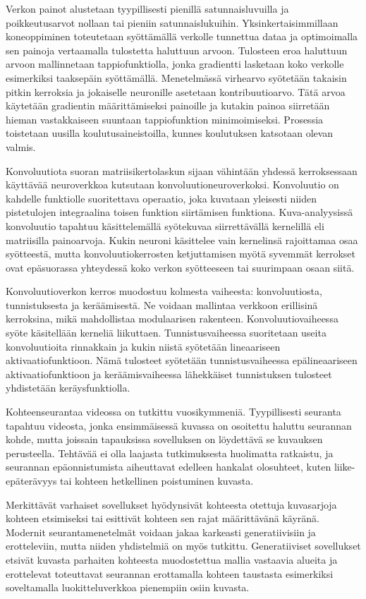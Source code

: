 Verkon painot alustetaan tyypillisesti pienillä satunnaisluvuilla ja poikkeutusarvot nollaan
tai pieniin satunnaislukuihin. Yksinkertaisimmillaan koneoppiminen toteutetaan syöttämällä
verkolle tunnettua dataa ja optimoimalla sen painoja vertaamalla tulostetta haluttuun arvoon.
Tulosteen eroa haluttuun arvoon mallinnetaan tappiofunktiolla, jonka gradientti lasketaan
koko verkolle esimerkiksi taaksepäin syöttämällä. Menetelmässä virhearvo syötetään takaisin
pitkin kerroksia ja jokaiselle neuronille asetetaan kontribuutioarvo. Tätä arvoa käytetään
gradientin määrittämiseksi painoille ja kutakin painoa siirretään hieman vastakkaiseen suuntaan
tappiofunktion minimoimiseksi. Prosessia toistetaan uusilla koulutusaineistoilla, kunnes
koulutuksen katsotaan olevan valmis.

Konvoluutiota suoran matriisikertolaskun sijaan vähintään yhdessä kerroksessaan käyttävää
neuroverkkoa kutsutaan konvoluutioneuroverkoksi. Konvoluutio on kahdelle funktiolle suoritettava
operaatio, joka kuvataan yleisesti niiden pistetulojen integraalina toisen funktion
siirtämisen funktiona. Kuva-analyysissä konvoluutio tapahtuu käsittelemällä syötekuvaa
siirrettävällä kernelillä eli matriisilla painoarvoja. Kukin neuroni käsittelee vain
kernelinsä rajoittamaa osaa syötteestä, mutta konvoluutiokerrosten ketjuttamisen myötä
syvemmät kerrokset ovat epäsuorassa yhteydessä koko verkon syötteeseen tai suurimpaan
osaan siitä.

Konvoluutioverkon kerros muodostuu kolmesta vaiheesta: konvoluutiosta, tunnistuksesta ja
keräämisestä. Ne voidaan mallintaa verkkoon erillisinä kerroksina, mikä mahdollistaa
modulaarisen rakenteen. Konvoluutiovaiheessa syöte käsitellään kerneliä liikuttaen.
Tunnistusvaiheessa suoritetaan useita konvoluutioita rinnakkain ja kukin niistä syötetään
lineaariseen aktivaatiofunktioon. Nämä tulosteet syötetään tunnistusvaiheessa epälineaariseen
aktivaatiofunktioon ja keräämisvaiheessa lähekkäiset tunnistuksen tulosteet yhdistetään
keräysfunktiolla.

Kohteenseurantaa videossa on tutkittu vuosikymmeniä. Tyypillisesti seuranta tapahtuu videosta,
jonka ensimmäisessä kuvassa on osoitettu haluttu seurannan kohde, mutta joissain tapauksissa
sovelluksen on löydettävä se kuvauksen perusteella. Tehtävää ei olla laajasta tutkimuksesta
huolimatta ratkaistu, ja seurannan epäonnistumista aiheuttavat edelleen hankalat olosuhteet,
kuten liike-epäterävyys tai kohteen hetkellinen poistuminen kuvasta.

Merkittävät varhaiset sovellukset hyödynsivät kohteesta otettuja kuvasarjoja kohteen etsimiseksi
tai esittivät kohteen sen rajat määrittävänä käyränä. Modernit seurantamenetelmät voidaan jakaa
karkeasti generatiivisiin ja erotteleviin, mutta niiden yhdistelmiä on myös tutkittu. Generatiiviset
sovellukset etsivät kuvasta parhaiten kohteesta muodostettua mallia vastaavia alueita ja erottelevat
toteuttavat seurannan erottamalla kohteen taustasta esimerkiksi soveltamalla luokitteluverkkoa
pienempiin osiin kuvasta.

